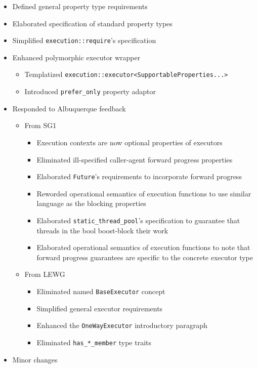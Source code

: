 \documentclass[a4paper,12pt,notitlepage,twoside,openright]{article}
\begin{document}
\begin{itemize}

\item
  Defined general property type requirements
\item
  Elaborated specification of standard property types
\item
  Simplified \texttt{execution::require}'s specification
\item
  Enhanced polymorphic executor wrapper

  \begin{itemize}

  \item
    Templatized
    \texttt{execution::executor<SupportableProperties...>}
  \item
    Introduced \texttt{prefer_only} property adaptor
  \end{itemize}
\item
  Responded to Albuquerque feedback

  \begin{itemize}

  \item
    From SG1

    \begin{itemize}

    \item
      Execution contexts are now optional properties of executors
    \item
      Eliminated ill-specified caller-agent forward progress properties
    \item
      Elaborated \texttt{Future}'s requirements to
      incorporate forward progress
    \item
      Reworded operational semantics of execution functions to use
      similar language as the blocking properties
    \item
      Elaborated \texttt{static_thread_pool}'s specification
      to guarantee that threads in the bool boost-block their work
    \item
      Elaborated operational semantics of execution functions to note
      that forward progress guarantees are specific to the concrete
      executor type
    \end{itemize}
  \item
    From LEWG

    \begin{itemize}

    \item
      Eliminated named \texttt{BaseExecutor} concept
    \item
      Simplified general executor requirements
    \item
      Enhanced the \texttt{OneWayExecutor} introductory
      paragraph
    \item
      Eliminated \texttt{has_*_member} type traits
    \end{itemize}
  \end{itemize}
\item
  Minor changes


\end{itemize}
\end{document}
